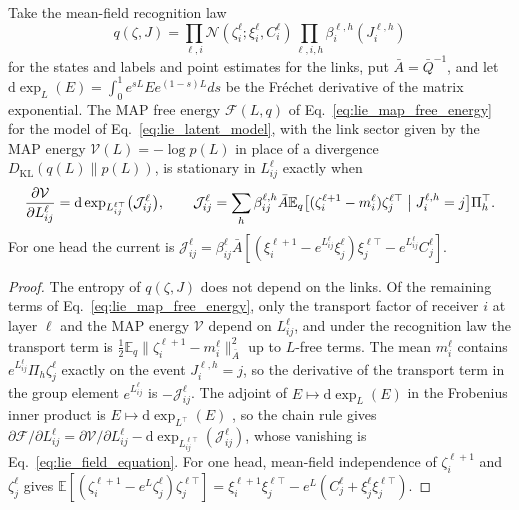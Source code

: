 \documentclass[twoside,11pt]{article}
\begin{document}
\begin{proposition}
\label{prop:lie_field_equation}
Take the mean-field recognition law
\begin{equation*}
q(\zeta,J)=\prod_{\ell,i}\mathcal N(\zeta_i^\ell;\xi_i^\ell,C_i^\ell)\prod_{\ell,i,h}\beta_i^{\ell,h}(J_i^{\ell,h})
\end{equation*}
for the states and labels and point estimates for the links, put $\bar A=\bar Q^{-1}$, and let $\mathrm d\exp_{L}(E)=\int_0^1e^{sL}Ee^{(1-s)L}ds$ be the Fr\'echet derivative of the matrix exponential. The MAP free energy $\mathcal F(L,q)$ of Eq.~\eqref{eq:lie_map_free_energy} for the model of Eq.~\eqref{eq:lie_latent_model}, with the link sector given by the MAP energy $\mathcal V(L)=-\log p(L)$ in place of a divergence $D_{\mathrm{KL}}(q(L)\|p(L))$, is stationary in $L_{ij}^\ell$ exactly when
\begin{equation}
\frac{\partial \mathcal V}{\partial L_{ij}^\ell}=\mathrm d\exp_{L_{ij}^{\ell\top}}\bigl(\mathcal J_{ij}^\ell\bigr),\qquad
\mathcal J_{ij}^\ell=\sum_h\beta_{ij}^{\ell,h}\bar A\mathbb E_q\bigl[(\zeta_i^{\ell+1}-m_i^\ell)\zeta_j^{\ell\top}\bigm|J_i^{\ell,h}=j\bigr]\Pi_h^\top.
\label{eq:lie_field_equation}
\end{equation}
For one head the current is $\mathcal J_{ij}^\ell=\beta_{ij}^\ell\bar A[(\xi_i^{\ell+1}-e^{L_{ij}^\ell}\xi_j^\ell)\xi_j^{\ell\top}-e^{L_{ij}^\ell}C_j^\ell]$.
\end{proposition}
\begin{proof}
The entropy of $q(\zeta,J)$ does not depend on the links. Of the remaining terms of Eq.~\eqref{eq:lie_map_free_energy}, only the transport factor of receiver $i$ at layer $\ell$ and the MAP energy $\mathcal V$ depend on $L_{ij}^\ell$, and under the recognition law the transport term is $\tfrac12\mathbb E_q\|\zeta_i^{\ell+1}-m_i^\ell\|_{\bar A}^2$ up to $L$-free terms. The mean $m_i^\ell$ contains $e^{L_{ij}^\ell}\Pi_h\zeta_j^\ell$ exactly on the event $J_i^{\ell,h}=j$, so the derivative of the transport term in the group element $e^{L_{ij}^\ell}$ is $-\mathcal J_{ij}^\ell$. The adjoint of $E\mapsto\mathrm d\exp_{L}(E)$ in the Frobenius inner product is $E\mapsto\mathrm d\exp_{L^\top}(E)$ \citep[Ch.~10]{Higham2008}, so the chain rule gives $\partial\mathcal F/\partial L_{ij}^\ell=\partial\mathcal V/\partial L_{ij}^\ell-\mathrm d\exp_{L_{ij}^{\ell\top}}(\mathcal J_{ij}^\ell)$, whose vanishing is Eq.~\eqref{eq:lie_field_equation}. For one head, mean-field independence of $\zeta_i^{\ell+1}$ and $\zeta_j^\ell$ gives $\mathbb E[(\zeta_i^{\ell+1}-e^L\zeta_j^\ell)\zeta_j^{\ell\top}]=\xi_i^{\ell+1}\xi_j^{\ell\top}-e^L(C_j^\ell+\xi_j^\ell\xi_j^{\ell\top})$.
\end{proof}
\end{document}
